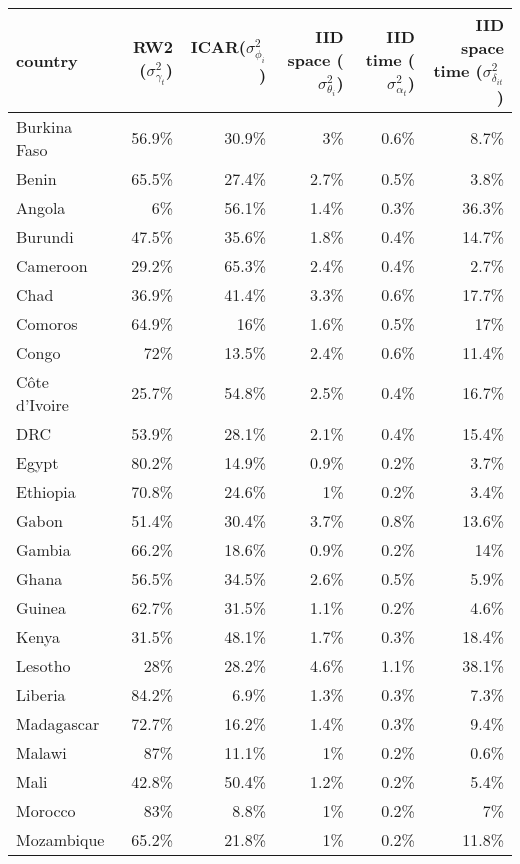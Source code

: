 \documentclass[12pt]{article}\usepackage[]{graphicx}\usepackage[]{color}
\begin{document}
\begin{table}[htb]
\centering\small
\begin{tabular}{lrrrrr}
  \hline
country & RW2 ($\sigma^2_{\gamma_t}$)& ICAR($\sigma^2_{\phi_i}$) & IID space ($\sigma^2_{\theta_i}$) & IID time ($\sigma^2_{\alpha_t}$) & IID space time ($\sigma^2_{\delta_{it}}$) \\ 
  \hline
  Burkina Faso & 56.9\% & 30.9\% & 3\% & 0.6\% & 8.7\% \\ 
  Benin & 65.5\% & 27.4\% & 2.7\% & 0.5\% & 3.8\% \\ 
  Angola & 6\% & 56.1\% & 1.4\% & 0.3\% & 36.3\% \\ 
  Burundi & 47.5\% & 35.6\% & 1.8\% & 0.4\% & 14.7\% \\ 
  Cameroon & 29.2\% & 65.3\% & 2.4\% & 0.4\% & 2.7\% \\ 
  Chad & 36.9\% & 41.4\% & 3.3\% & 0.6\% & 17.7\% \\ 
  Comoros & 64.9\% & 16\% & 1.6\% & 0.5\% & 17\% \\ 
  Congo & 72\% & 13.5\% & 2.4\% & 0.6\% & 11.4\% \\ 
  C\^{o}te d'Ivoire & 25.7\% & 54.8\% & 2.5\% & 0.4\% & 16.7\% \\ 
  DRC & 53.9\% & 28.1\% & 2.1\% & 0.4\% & 15.4\% \\ 
  Egypt & 80.2\% & 14.9\% & 0.9\% & 0.2\% & 3.7\% \\ 
  Ethiopia & 70.8\% & 24.6\% & 1\% & 0.2\% & 3.4\% \\ 
  Gabon & 51.4\% & 30.4\% & 3.7\% & 0.8\% & 13.6\% \\ 
  Gambia & 66.2\% & 18.6\% & 0.9\% & 0.2\% & 14\% \\ 
  Ghana & 56.5\% & 34.5\% & 2.6\% & 0.5\% & 5.9\% \\ 
  Guinea & 62.7\% & 31.5\% & 1.1\% & 0.2\% & 4.6\% \\ 
  Kenya & 31.5\% & 48.1\% & 1.7\% & 0.3\% & 18.4\% \\ 
  Lesotho & 28\% & 28.2\% & 4.6\% & 1.1\% & 38.1\% \\ 
  Liberia & 84.2\% & 6.9\% & 1.3\% & 0.3\% & 7.3\% \\ 
  Madagascar & 72.7\% & 16.2\% & 1.4\% & 0.3\% & 9.4\% \\ 
  Malawi & 87\% & 11.1\% & 1\% & 0.2\% & 0.6\% \\ 
  Mali & 42.8\% & 50.4\% & 1.2\% & 0.2\% & 5.4\% \\ 
  Morocco & 83\% & 8.8\% & 1\% & 0.2\% & 7\% \\ 
  Mozambique & 65.2\% & 21.8\% & 1\% & 0.2\% & 11.8\% \\ 

\end{tabular}
\end{table}
\end{document}
